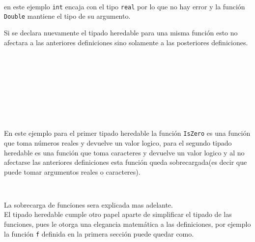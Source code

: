       \begin{fxcode}
         \\
      \end{fxcode}
      
      en este ejemplo \texttt{int} encaja con el tipo \texttt{real} por lo que no hay error y la función \texttt{Double} mantiene el tipo de su argumento.
      
      Si se declara nuevamente el tipado heredable para una misma función esto no afectara a las anteriores definiciones sino solamente a las posteriores definiciones.
      
      \begin{fxcode}
         \\
         \\
         \\
         \\
         \\
         \\
         \\
      \end{fxcode}
      
      En este ejemplo para el primer tipado heredable la función \texttt{IsZero} es una función que toma números reales y devuelve un valor logico, para el segundo tipado heredable es una función que toma caracteres y devuelve un valor logico y al no afectarse las anteriores definiciones esta función queda sobrecargada(es decir que puede tomar argumentos reales o caracteres).
      
      \begin{fxcode}
         \\
      \end{fxcode}
      
      La sobrecarga de funciones sera explicada mas adelante.
      \\
      
      El tipado heredable cumple otro papel aparte de simplificar el tipado de las funciones, pues le otorga una elegancia matemática a las definiciones, por ejemplo la función \texttt{f} definida en la primera sección puede quedar como.
      \\
      

